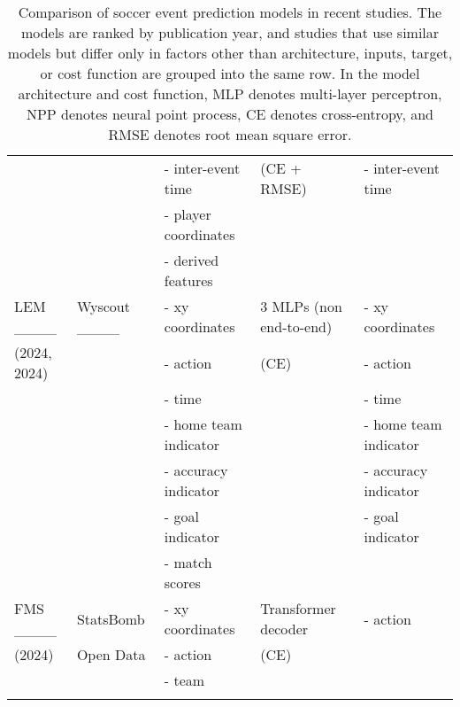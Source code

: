 \begin{table}[h]
\begin{tabular}{lllll}
                 &                     & - inter-event time              & (CE + RMSE)                                & - inter-event time \\ 
                 &                     & - player coordinates            &                                 &                              \\ 
                 &                     & - derived features\footnotemark[2]              &                                 &                              \\ 
\hline
LEM ____            & Wyscout ____            & - xy coordinates                & 3 MLPs (non end-to-end)                          & - xy coordinates            \\ 
(2024, 2024)                 &                     & - action                        & (CE)                              & - action                    \\ 
                 &                     & - time                          &                                 & - time                      \\ 
                 &                     & - home team indicator                         &                                 & - home team indicator                   \\ 
                 &                     & - accuracy indicator                      &                                 & - accuracy indicator    \\ 
                 &                     & - goal indicator                &                                 & - goal indicator              \\ 
                 &                     & - match scores                        &                                 &                              \\ 
\hline
FMS ____              & StatsBomb            & - xy coordinates                & Transformer decoder             & - action        \\ 
 (2024)                & Open Data\footnotemark[1]                    & - action                        & (CE)                              &                              \\ 
                 &                     & - team                          &                                 &                              \\ 
\botrule
\end{tabular}
\caption{Comparison of soccer event prediction models in recent studies. The models are ranked by publication year, and studies that use similar models but differ only in factors other than architecture, inputs, target, or cost function are grouped into the same row. In the model architecture and cost function, MLP denotes multi-layer perceptron, NPP denotes neural point process, CE denotes cross-entropy, and RMSE denotes root mean square error.}
\label{Tab:compare_event_model}
\end{table}


